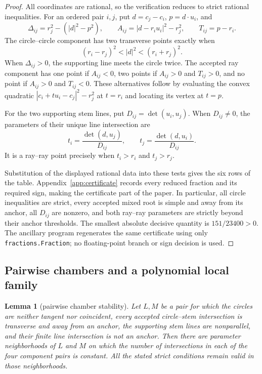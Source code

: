 \documentclass[11pt]{article}
\theoremstyle{plain}
\newtheorem{lemma}[theorem]{Lemma}
\theoremstyle{definition}
\theoremstyle{remark}
\newcommand{\1}{\mathbf 1}
\begin{document}
\begin{proof}
All coordinates are rational, so the verification reduces to strict rational
inequalities.  For an ordered pair $i,j$, put $d=c_j-c_i$,
$p=d\cdot u_i$, and
\[
 \Delta_{ij}=r_j^2-(|d|^2-p^2),\qquad
 A_{ij}=|d-r_i u_i|^2-r_j^2,\qquad
 T_{ij}=p-r_i.
\]
The circle--circle component has two transverse points exactly when
\[
 (r_i-r_j)^2<|d|^2<(r_i+r_j)^2.
\]
When $\Delta_{ij}>0$, the supporting line meets the circle twice.  The
accepted ray component has one point if $A_{ij}<0$, two points if
$A_{ij}>0$ and $T_{ij}>0$, and no point if $A_{ij}>0$ and $T_{ij}<0$.
These alternatives follow by evaluating the convex quadratic
$|c_i+t u_i-c_j|^2-r_j^2$ at $t=r_i$ and locating its vertex at $t=p$.

For the two supporting stem lines, put
$D_{ij}=\det(u_i,u_j)$.  When $D_{ij}\ne0$, the parameters of their unique
line intersection are
\[
 t_i=\frac{\det(d,u_j)}{D_{ij}},\qquad
 t_j=\frac{\det(d,u_i)}{D_{ij}}.
\]
It is a ray--ray point precisely when $t_i>r_i$ and $t_j>r_j$.

Substitution of the displayed rational data into these tests gives the six
rows of the table.  Appendix~\ref{app:certificate} records every reduced
fraction and its required sign, making the certificate part of the paper.
In particular, all circle inequalities are strict, every accepted mixed root
is simple and away from its anchor, all $D_{ij}$ are nonzero, and both
ray--ray parameters are strictly beyond their anchor thresholds.  The
smallest absolute decisive quantity is $151/23400>0$.  The ancillary program
 regenerates the same certificate
using only \texttt{fractions.Fraction}; no floating-point branch or sign
decision is used.
\end{proof}

\subsection{Pairwise chambers and a polynomial local family}

\begin{lemma}[pairwise chamber stability]\label{lem:chamber}
Let $L,M$ be a pair for which the circles are neither tangent nor coincident,
every accepted circle--stem intersection is transverse and away from an
anchor, the supporting stem lines are nonparallel, and their finite line
intersection is not an anchor.  Then there are parameter neighborhoods of
$L$ and $M$ on which the number of intersections in each of the four
component pairs is constant.  All the stated strict conditions remain valid
in those neighborhoods.
\end{lemma}
\end{document}
